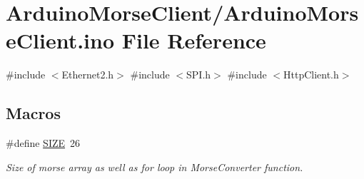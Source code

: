 \hypertarget{_arduino_morse_client_8ino}{}\section{Arduino\+Morse\+Client/\+Arduino\+Morse\+Client.ino File Reference}
\label{_arduino_morse_client_8ino}
{\ttfamily \#include $<$Ethernet2.\+h$>$}\newline
{\ttfamily \#include $<$S\+P\+I.\+h$>$}\newline
{\ttfamily \#include $<$Http\+Client.\+h$>$}\newline
\subsection*{Macros}
\begin{DoxyCompactItemize}
\item 
\mbox{\label{_arduino_morse_client_8ino_a70ed59adcb4159ac551058053e649640}} 
\#define \mbox{\hyperlink{_arduino_morse_client_8ino_a70ed59adcb4159ac551058053e649640}{S\+I\+ZE}}~26
\begin{DoxyCompactList}\small\item\em Size of morse array as well as for loop in Morse\+Converter function. \end{DoxyCompactList}\end{DoxyCompactItemize}
